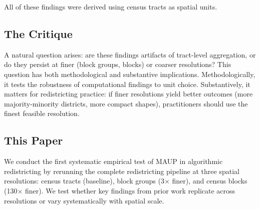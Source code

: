 All of these findings were derived using census tracts as spatial units.

\subsection{The Critique}

A natural question arises: are these findings artifacts of tract-level aggregation, or do they persist at finer (block groups, blocks) or coarser resolutions? This question has both methodological and substantive implications. Methodologically, it tests the robustness of computational findings to unit choice. Substantively, it matters for redistricting practice: if finer resolutions yield better outcomes (more majority-minority districts, more compact shapes), practitioners should use the finest feasible resolution.

\subsection{This Paper}

We conduct the first systematic empirical test of MAUP in algorithmic redistricting by rerunning the complete redistricting pipeline at three spatial resolutions: census tracts (baseline), block groups (3$\times$ finer), and census blocks (130$\times$ finer). We test whether key findings from prior work replicate across resolutions or vary systematically with spatial scale.

